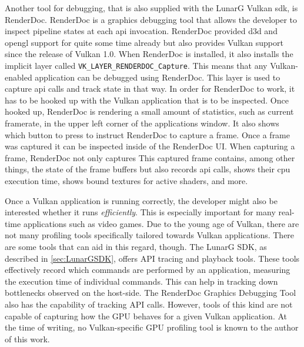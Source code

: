     Another tool for debugging, that is also supplied with the LunarG Vulkan \gls{sdk}, is RenderDoc\cite{renderdoc}.
    RenderDoc is a graphics debugging tool that allows the developer to inspect pipeline states at each \gls{api} invocation.
    RenderDoc provided \gls{d3d} and \gls{opengl} support for quite some time already but also provides Vulkan support since the release of Vulkan 1.0.
    When RenderDoc is installed, it also installs the implicit layer called \lstinline{VK_LAYER_RENDERDOC_Capture}.
    This means that any Vulkan-enabled application can be debugged using RenderDoc.
    This layer is used to capture \gls{api} calls and track state in that way.
    In order for RenderDoc to work, it has to be hooked up with the Vulkan application that is to be inspected.
    Once hooked up, RenderDoc is rendering a small amount of statistics, such as current framerate, in the upper left corner of the applications window.
    It also shows which button to press to instruct RenderDoc to capture a frame.
    Once a frame was captured it can be inspected inside of the RenderDoc UI.
    When capturing a frame, RenderDoc not only captures
    This captured frame contains, among other things, the state of the frame buffers but also records \gls{api} calls, shows their \gls{cpu} execution time, shows bound textures for active shaders, and more.

    Once a Vulkan application is running correctly, the developer might also be interested whether it runs \textit{efficiently}.
    This is especially important for many real-time applications such as video games.
    Due to the young age of Vulkan, there are not many profiling tools specifically tailored towards Vulkan applications.
    There are some tools that can aid in this regard, though.
    The LunarG SDK, as described in \ref{sec:LunarGSDK}, offers API tracing and playback tools.
    These tools effectively record which commands are performed by an application, measuring the execution time of individual commands.
    This can help in tracking down bottlenecks observed on the host-side.
    The RenderDoc Graphics Debugging Tool\cite{renderdoc} also has the capability of tracking API calls.
    However, tools of this kind are not capable of capturing how the GPU behaves for a given Vulkan application.
    At the time of writing, no Vulkan-specific GPU profiling tool is known to the author of this work.


